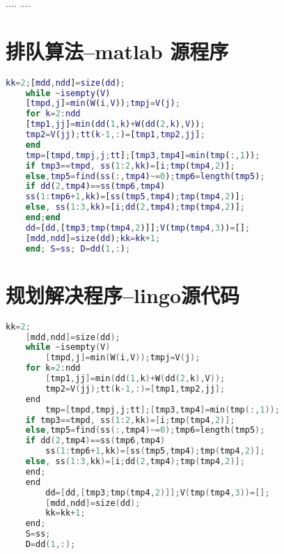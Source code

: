 \documentclass{article}
\begin{document}
    
    \begin{thebibliography}{9}%
      ....
      ....
    \end{thebibliography}
    
    \newpage
    \appendix
    \section{排队算法--matlab 源程序}
    \begin{lstlisting}[language=matlab]
    kk=2;[mdd,ndd]=size(dd);
    while ~isempty(V)
    [tmpd,j]=min(W(i,V));tmpj=V(j);
    for k=2:ndd
    [tmp1,jj]=min(dd(1,k)+W(dd(2,k),V));
    tmp2=V(jj);tt(k-1,:)=[tmp1,tmp2,jj];
    end
    tmp=[tmpd,tmpj,j;tt];[tmp3,tmp4]=min(tmp(:,1));
    if tmp3==tmpd, ss(1:2,kk)=[i;tmp(tmp4,2)];
    else,tmp5=find(ss(:,tmp4)~=0);tmp6=length(tmp5);
    if dd(2,tmp4)==ss(tmp6,tmp4)
    ss(1:tmp6+1,kk)=[ss(tmp5,tmp4);tmp(tmp4,2)];
    else, ss(1:3,kk)=[i;dd(2,tmp4);tmp(tmp4,2)];
    end;end
    dd=[dd,[tmp3;tmp(tmp4,2)]];V(tmp(tmp4,3))=[];
    [mdd,ndd]=size(dd);kk=kk+1;
    end; S=ss; D=dd(1,:);
     \end{lstlisting}
     \section{规划解决程序--lingo源代码}
    \begin{lstlisting}[language=c]
    kk=2;
    [mdd,ndd]=size(dd);
    while ~isempty(V)
        [tmpd,j]=min(W(i,V));tmpj=V(j);
    for k=2:ndd
        [tmp1,jj]=min(dd(1,k)+W(dd(2,k),V));
        tmp2=V(jj);tt(k-1,:)=[tmp1,tmp2,jj];
    end
        tmp=[tmpd,tmpj,j;tt];[tmp3,tmp4]=min(tmp(:,1));
    if tmp3==tmpd, ss(1:2,kk)=[i;tmp(tmp4,2)];
    else,tmp5=find(ss(:,tmp4)~=0);tmp6=length(tmp5);
    if dd(2,tmp4)==ss(tmp6,tmp4)
        ss(1:tmp6+1,kk)=[ss(tmp5,tmp4);tmp(tmp4,2)];
    else, ss(1:3,kk)=[i;dd(2,tmp4);tmp(tmp4,2)];
    end;
    end
        dd=[dd,[tmp3;tmp(tmp4,2)]];V(tmp(tmp4,3))=[];
        [mdd,ndd]=size(dd);
        kk=kk+1;
    end;
    S=ss;
    D=dd(1,:);
     \end{lstlisting}
    
    
    
\end{document}

